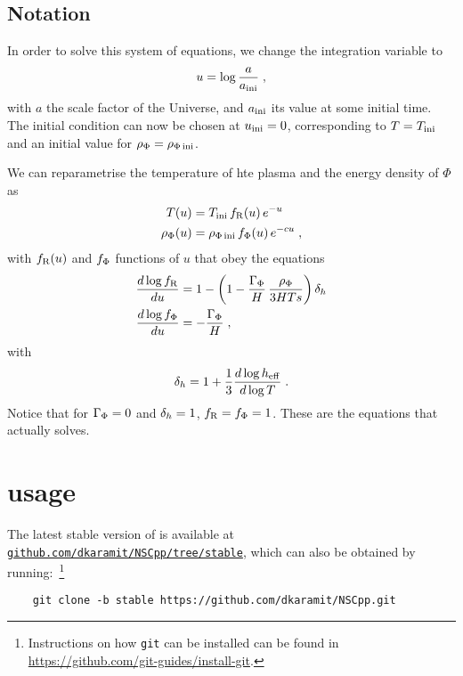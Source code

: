 \documentclass[11pt,a4paper]{article}
\begin{document}
\subsection{Notation}\label{sec:notation}

In order to solve this system of equations, we change the integration variable to 
%
\begin{equation}
	u=\log\frac{a}{a_{\rm ini}{}}\;,	
	\label{eq:u_def}
\end{equation}
%
with $a$ the scale factor of the Universe, and $a_{\rm ini}{}$ its value at some initial time. The initial condition can now be chosen at $u_{\rm ini}{}=0$, corresponding to $T=T_{\rm ini}{}$ and an initial value for $\rho_{\Phi}=\rho_{\Phi\,{\rm ini}}$. 

We can reparametrise the temperature of hte plasma and the energy density of $\Phi$ as 
%
\begin{align}
	T(u) &= T_{\rm ini}{}  \, f_{\rm R}(u) \, e^{-u}  \label{eq:fR_def} \\ 
	\rho_{\Phi}(u) &= \rho_{\Phi\,{\rm ini}} \, f_{\Phi}(u) \label{eq:fPhi_def} \, e^{-cu}\;,
\end{align}
%
with $f_{\rm R}(u)$ and $f_{\Phi}$ functions of $u$ that obey the equations
%
\begin{align}
	\dfrac{d\log f_{\rm R} }{du} &=  1- \left( 1- \dfrac{\Gamma_{\Phi}}{H} \, \dfrac{\rho_{\Phi}}{3HTs}   \right) \delta_h{}  \label{eq:dlogfRdu} \\ 
	\dfrac{d\log f_{\Phi}}{du} &= -\dfrac{\Gamma_{\Phi}}{H} \label{eq:dlogfPhidu } \;,
\end{align}
%
with 
\begin{equation}
	\delta_h{} = 1+ \dfrac{1}{3} \dfrac{d\log h_{\rm eff}{}}{d\log T}\;.
	\label{eq:dh_def}
\end{equation}
%
Notice that  for $\Gamma_{\Phi}=0$ and $\delta_h{}=1$, $f_{\rm R}=f_{\Phi}=1$. These are the equations that \nsc actually solves. 

\section{\nsc usage}\label{sec:first_steps}
\setcounter{equation}{0}
%
The latest stable version of \nsc is available at \href{https://github.com/dkaramit/NSCpp/tree/stable}{\tt github.com/dkaramit/NSCpp/tree/stable}, which can also be obtained by running:~\footnote{Instructions on how {\tt git} can be installed can be found in \href{https://github.com/git-guides/install-git}{https://github.com/git-guides/install-git}. }
%
\begin{lstlisting}
	git clone -b stable https://github.com/dkaramit/NSCpp.git
\end{lstlisting}
\end{document}
